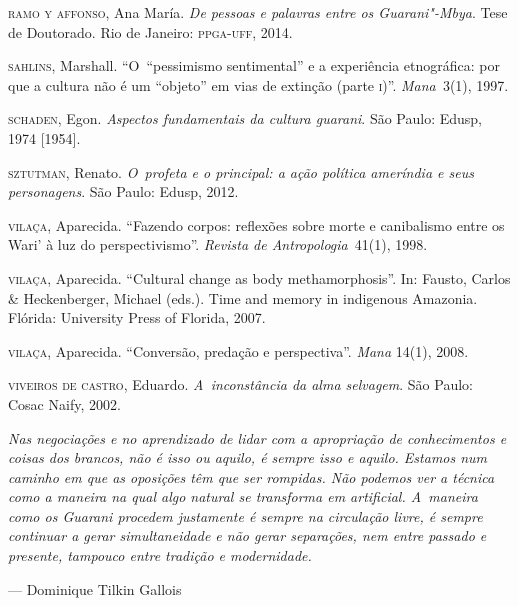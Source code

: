 \begin{Parskip}
\textsc{ramo} \textsc{y} \textsc{affonso}, Ana María. \emph{De pessoas e palavras entre os Guarani"-Mbya}.
Tese de Doutorado. Rio de Janeiro: \textsc{ppga}-\textsc{uff}, 2014.

\textsc{sahlins}, Marshall. ``O~``pessimismo sentimental'' e a experiência
etnográfica: por que a cultura não é um ``objeto'' em vias de extinção
(parte \textsc{i})''. \emph{Mana~}3(1), 1997.

\textsc{schaden}, Egon. \emph{Aspectos fundamentais da cultura guarani}. São Paulo:
Edusp, 1974 [1954].

\textsc{sztutman}, Renato. \emph{O~profeta e o principal: a ação política ameríndia e
seus personagens}. São Paulo: Edusp, 2012.

\textsc{vilaça}, Aparecida. ``Fazendo corpos: reflexões sobre morte e canibalismo
entre os Wari’ à luz do perspectivismo''. \emph{Revista de Antropologia}~41(1),
1998.

\textsc{vilaça}, Aparecida. ``Cultural change as body methamorphosis''. In: Fausto,
Carlos \& Heckenberger, Michael (eds.). Time and memory in indigenous
Amazonia. Flórida: University Press of Florida, 2007.

\textsc{vilaça}, Aparecida. ``Conversão, predação e perspectiva''. \emph{Mana} 14(1), 2008.

\textsc{viveiros} \textsc{de} \textsc{castro}, Eduardo. \emph{A~inconstância da alma selvagem}. São Paulo:
Cosac Naify, 2002.
\end{Parskip}

\clearpage

\vspace*{\fill}

\begin{flushright}
\begin{minipage}[c]{0.85\textwidth}
\raggedleft
\footnotesize
\emph{Nas negociações e no aprendizado de lidar com a apropriação de
conhecimentos e coisas dos brancos, não é isso \emph{ou} aquilo, é sempre isso
\emph{e} aquilo. Estamos num caminho em que as oposições têm que ser rompidas.
Não podemos ver a técnica como a maneira na qual algo natural se
transforma em artificial. A~maneira como os Guarani procedem justamente
é sempre na circulação livre, é sempre continuar a gerar simultaneidade
e não gerar separações, nem entre passado e presente, tampouco entre
tradição e modernidade.}

\smallskip
\hspace*{\fill}--- Dominique Tilkin Gallois
\end{minipage}
\end{flushright}

